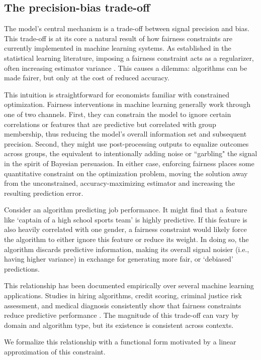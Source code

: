 \subsection{The precision-bias trade-off}
The model's central mechanism is a trade-off between signal precision and bias. This trade-off is at its core a natural result of how fairness constraints are currently implemented in machine learning systems. As established in the statistical learning literature, imposing a fairness constraint acts as a regularizer, often increasing estimator variance \citep{Kamishima2012, Wick2019}. This causes a dilemma: algorithms can be made fairer, but only at the cost of reduced accuracy.

This intuition is straightforward for economists familiar with constrained optimization. Fairness interventions in machine learning generally work through one of two channels. First, they can constrain the model to ignore certain correlations or features that are predictive but correlated with group membership, thus reducing the model's overall information set and subsequent precision. Second, they might use post-processing outputs to equalize outcomes across groups, the equivalent to intentionally adding noise or ``garbling" the signal in the spirit of Bayesian persuasion. In either case, enforcing fairness places some quantitative constraint on the optimization problem, moving the solution away from the unconstrained, accuracy-maximizing estimator and increasing the resulting prediction error.

Consider an algorithm predicting job performance. It might find that a feature like `captain of a high school sports team' is highly predictive. If this feature is also heavily correlated with one gender, a fairness constraint would likely force the algorithm to either ignore this feature or reduce its weight. In doing so, the algorithm discards predictive information, making its overall signal noisier (i.e., having higher variance) in exchange for generating more fair, or `debiased' predictions.

This relationship has been documented empirically over several machine learning applications. Studies in hiring algorithms, credit scoring, criminal justice risk assessment, and medical diagnosis consistently show that fairness constraints reduce predictive performance \citep{Kleinberg2017, Chouldechova2017}. The magnitude of this trade-off can vary by domain and algorithm type, but its existence is consistent across contexts.

We formalize this relationship with a functional form motivated by a linear approximation of this constraint.

